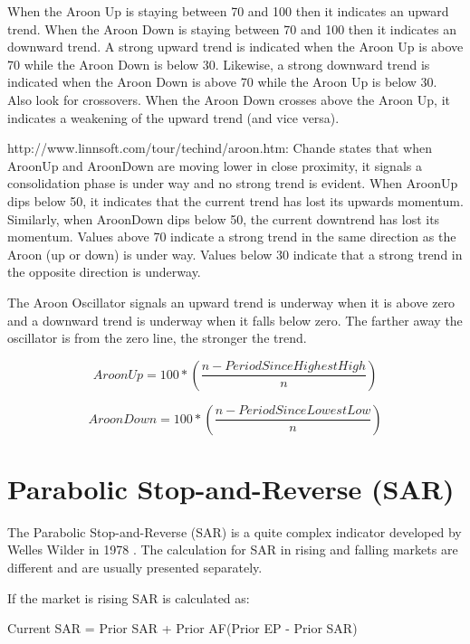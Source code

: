 When the Aroon Up is staying between 70 and 100 then it indicates an upward trend. When the Aroon Down is staying between 70 and 100 then it indicates an downward trend. A strong upward trend is indicated when the Aroon Up is above 70 while the Aroon Down is below 30. Likewise, a strong downward trend is indicated when the Aroon Down is above 70 while the Aroon Up is below 30. Also look for crossovers. When the Aroon Down crosses above the Aroon Up, it indicates a weakening of the upward trend (and vice versa).

http://www.linnsoft.com/tour/techind/aroon.htm:
Chande states that when AroonUp and AroonDown are moving lower in close proximity, it signals a consolidation phase is under way and no strong trend is evident. When AroonUp dips below 50, it indicates that the current trend has lost its upwards momentum. Similarly, when AroonDown dips below 50, the current downtrend has lost its momentum. Values above 70 indicate a strong trend in the same direction as the Aroon (up or down) is under way. Values below 30 indicate that a strong trend in the opposite direction is underway.

The Aroon Oscillator signals an upward trend is underway when it is above zero and a downward trend is underway when it falls below zero. The farther away the oscillator is from the zero line, the stronger the trend.


\[ Aroon Up = 100 * \left( \dfrac{n - PeriodSinceHighestHigh}{n} \right) \]

\[ Aroon Down = 100 * \left( \dfrac{n - PeriodSinceLowestLow}{n} \right) \]


\section{Parabolic Stop-and-Reverse (SAR)}
\label{appB:sar}
The Parabolic Stop-and-Reverse (SAR) is a quite complex indicator developed by Welles Wilder in 1978 \citep{wilder1978new}. The calculation for SAR in rising and falling markets are different and are usually presented separately.

If the market is rising SAR is calculated as:
\begin{center}
Current SAR = Prior SAR + Prior AF(Prior EP - Prior SAR)
\end{center}

